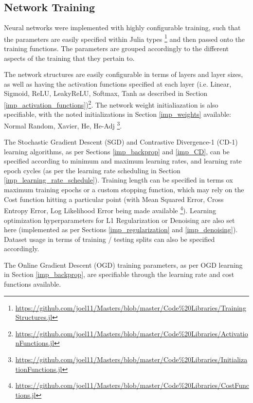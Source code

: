 \documentclass[a4paper,11pt,oneside]{article}
\theoremstyle{plain}
\theoremstyle{definition}
\begin{document}
	
	\subsection{Network Training}
	
	Neural networks were implemented with highly configurable training, such that the parameters are easily specified within Julia types \footnote{\url{https://github.com/joel11/Masters/blob/master/Code\%20Libraries/TrainingStructures.jl}} and then passed onto the training functions. The parameters are grouped accordingly to the different aspects of the training that they pertain to. \newline
	
	The network structures are easily configurable in terms of layers and layer sizes, as well as having the activation functions specified at each layer (i.e. Linear, Sigmoid, ReLU, LeakyReLU, Softmax, Tanh as described in Section \ref{imp_activation_functions})\footnote{\url{https://github.com/joel11/Masters/blob/master/Code\%20Libraries/ActivationFunctions.jl}}. The network weight initialiazation is also specifiable, with the noted initializations in Section \ref{imp_weights} available: Normal Random, Xavier, He, He-Adj \footnote{\url{https://github.com/joel11/Masters/blob/master/Code\%20Libraries/InitializationFunctions.jl}}.\newline
	
	The Stochastic Gradient Descent (SGD) and Contrastive Divergence-1 (CD-1) learning algorithms, as per Sections \ref{imp_backprop} and \ref{imp_CD}, can be specified according to minimum and maximum learning rates, and learning rate epoch cycles (as per the learning rate scheduling in Section \ref{imp_learning_rate_schedule}). Training length can be specified in terms ox maximum training epochs or a custom stopping function, which may rely on the Cost function hitting a particular point (with Mean Squared Error, Cross Entropy Error, Log Likelihood Error being made available \footnote{\url{https://github.com/joel11/Masters/blob/master/Code\%20Libraries/CostFunctions.jl}}). Learning optimization hyperparameters for L1 Regularization or Denoising are also set here (implemented as per Sections \ref{imp_regularization} and \ref{imp_denoising}). Dataset usage in terms of training / testing splits can also be specified accordingly.\newline
	
	The Online Gradient Descent (OGD) training parameters, as per OGD learning in Section \ref{imp_backprop}, are specifiable through the learning rate and cost functions available.\newline
	
\end{document}
